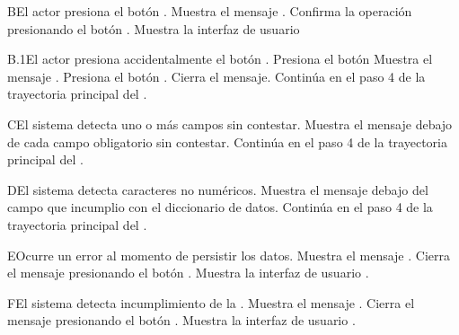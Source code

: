 \begin{UCtrayectoriaA}{B}{El actor presiona el botón .}
	\UCpaso Muestra el mensaje .
	\UCpaso[\UCactor] Confirma la operación presionando el botón .
	\UCpaso Muestra la interfaz de usuario 
\end{UCtrayectoriaA}

\begin{UCtrayectoriaA}{B.1}{El actor presiona accidentalmente el botón .}
	\UCpaso[\UCactor] Presiona el botón 
	\UCpaso Muestra el mensaje .
	\UCpaso[\UCactor] Presiona el botón .
	\UCpaso Cierra el mensaje.
	\UCpaso Continúa en el paso 4 de la trayectoria principal del .
\end{UCtrayectoriaA}

\begin{UCtrayectoriaA}{C}{El sistema detecta uno o más campos sin contestar.}
	\UCpaso Muestra el mensaje  debajo de cada campo obligatorio sin contestar.
	\UCpaso Continúa en el paso 4 de la trayectoria principal del .
\end{UCtrayectoriaA}

\begin{UCtrayectoriaA}{D}{El sistema detecta caracteres no numéricos.}
	\UCpaso Muestra el mensaje  debajo del campo que incumplio con el diccionario de datos.
	\UCpaso Continúa en el paso 4 de la trayectoria principal del .
\end{UCtrayectoriaA}

\begin{UCtrayectoriaA}{E}{Ocurre un error al momento de persistir los datos.}
	\UCpaso Muestra el mensaje .
	\UCpaso[\UCactor] Cierra el mensaje presionando el botón .
	\UCpaso Muestra la interfaz de usuario .
\end{UCtrayectoriaA}

\begin{UCtrayectoriaA}{F}{El sistema detecta incumplimiento de la  .}
	\UCpaso Muestra el mensaje .
	\UCpaso[\UCactor] Cierra el mensaje presionando el botón .
	\UCpaso Muestra la interfaz de usuario .
\end{UCtrayectoriaA}

